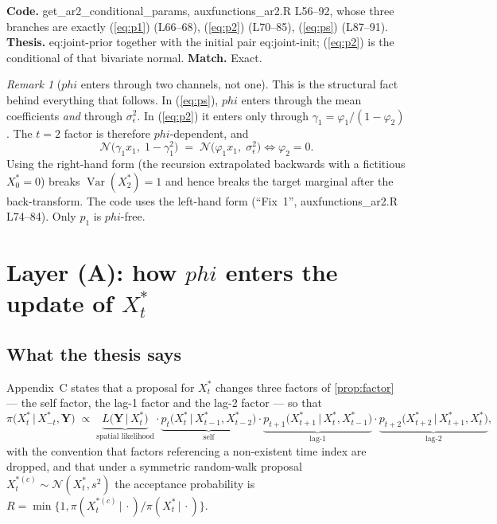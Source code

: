 \documentclass[11pt]{article}
\newcommand{\bphi}{\boldsymbol{\varphi}}
\newcommand{\bY}{\mathbf{Y}}
\newcommand{\Norm}{\mathcal{N}}
\newcommand{\given}{\,\vert\,}
\DeclareRobustCommand{\code}[1]{\texttt{#1}}
\newcommand{\eref}[1]{(\ref{#1})}
\def\bphi{phi}%
\def\boldsymbol#1{#1}%
\def\code#1{#1}%
\theoremstyle{plain}
\theoremstyle{definition}
\theoremstyle{remark}
\newtheorem{remark}[proposition]{Remark}
\begin{document}
\noindent
\textbf{Code.} \code{get\_ar2\_conditional\_params},
\code{auxfunctions\_ar2.R} L56--92, whose three branches are exactly
\eref{eq:p1} (L66--68), \eref{eq:p2} (L70--85), \eref{eq:ps} (L87--91).
\textbf{Thesis.} \code{eq:joint-prior} together with the initial pair
\code{eq:joint-init}; \eref{eq:p2} is the conditional of that bivariate
normal. \textbf{Match.} Exact.

\begin{remark}[$\bphi$ enters through two channels, not one]\label{rem:two-channels}
This is the structural fact behind everything that follows. In \eref{eq:ps},
$\bphi$ enters through the mean coefficients \emph{and} through
$\sigma_\epsilon^2$. In \eref{eq:p2} it enters only through
$\gamma_1 = \varphi_1/(1-\varphi_2)$. The $t = 2$ factor is therefore
$\bphi$-dependent, and
\begin{equation}\label{eq:p2-neq}
  \Norm\!\bigl(\gamma_1 x_1,\; 1-\gamma_1^2\bigr)
  \;=\;
  \Norm\!\bigl(\varphi_1 x_1,\; \sigma_\epsilon^2\bigr)
  \iff \varphi_2 = 0 .
\end{equation}
Using the right-hand form (the recursion extrapolated backwards with a
fictitious $X^{*}_0 = 0$) breaks $\operatorname{Var}(X^{*}_2) = 1$ and hence
breaks the target marginal after the back-transform. The code uses the
left-hand form (``Fix~1'', \code{auxfunctions\_ar2.R} L74--84). Only $p_1$
is $\bphi$-free.
\end{remark}

\section{Layer (A): how $\bphi$ enters the update of $X^{*}_t$}
\label{sec:layerA}

\subsection{What the thesis says}

Appendix~C states that a proposal for $X^{*}_t$ changes three factors of
\cref{prop:factor} --- the self factor, the lag-1 factor and the lag-2 factor
--- so that
\begin{equation}\label{eq:fullcond}
  \pi\bigl(X^{*}_t \given X^{*}_{-t}, \bY\bigr)
  \;\propto\;
  \underbrace{L\bigl(\bY \given X^{*}_t\bigr)}_{\text{spatial likelihood}}
  \cdot
  \underbrace{p_t\bigl(X^{*}_t \given X^{*}_{t-1}, X^{*}_{t-2}\bigr)}_{\text{self}}
  \cdot
  \underbrace{p_{t+1}\bigl(X^{*}_{t+1} \given X^{*}_t, X^{*}_{t-1}\bigr)}_{\text{lag-1}}
  \cdot
  \underbrace{p_{t+2}\bigl(X^{*}_{t+2} \given X^{*}_{t+1}, X^{*}_t\bigr)}_{\text{lag-2}},
\end{equation}
with the convention that factors referencing a non-existent time index are
dropped, and that under a symmetric random-walk proposal
$X^{*(c)}_t \sim \Norm(X^{*}_t, s^2)$ the acceptance probability is
$R = \min\{1, \pi(X^{*(c)}_t \given \cdot)/\pi(X^{*}_t \given \cdot)\}$.
\end{document}
